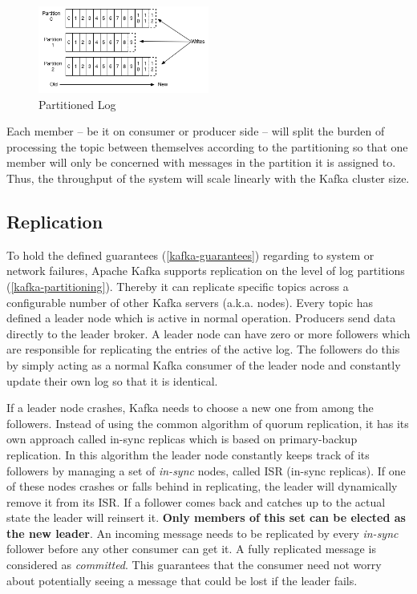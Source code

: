 \begin{figure}[H]
    \centering
    \includegraphics[width=0.5\textwidth]{images/log_anatomy.png}
    \caption{Partitioned Log \cite{apachekafka}}
    \label{fig:the-log}
\end{figure}

Each member -- be it on consumer or producer side -- will split the burden of
processing the topic between themselves according to the partitioning so that
one member will only be concerned with messages in the partition it is
assigned to. Thus, the throughput of the system will scale linearly with the
Kafka cluster size. \cite{apachekafka}


\subsection{Replication}
\label{kafka-replication}
To hold the defined guarantees (\ref{kafka-guarantees}) regarding to system
or network failures, Apache Kafka supports \gls{replication} on the level of log
partitions (\ref{kafka-partitioning}). Thereby it can replicate specific topics
across a configurable number of other Kafka servers (a.k.a. nodes). Every
topic has defined a leader node which is active in normal operation. Producers
send data directly to the leader broker. A leader node can have zero or
more followers which are responsible for replicating the entries of the active
log. The followers do this by simply acting as a normal Kafka consumer of the
leader node and constantly update their own log so that it is identical.
\cite{apachekafka}

If a leader node crashes, Kafka needs to choose a new one from among the
followers. Instead of using the common algorithm of quorum replication, it
has its own approach called in-sync replicas which is based on primary-backup
replication. In this algorithm the leader node
constantly keeps track of its followers by managing a set of \textit{in-sync}
nodes, called ISR (in-sync replicas). If one of these nodes crashes or falls
behind in replicating, the leader will dynamically remove it from its ISR. If a
follower comes back and catches up to the actual state the leader will reinsert
it. \textbf{Only members of this set can be elected as the new leader}. An incoming
message needs to be replicated by every \textit{in-sync} follower before any
other consumer can get it. A fully replicated message is considered as
\textit{committed}. This guarantees that the consumer need not worry about potentially
seeing a message that could be lost if the leader fails. \cite{apachekafka}
\cite{kafka-wiki-replication}

